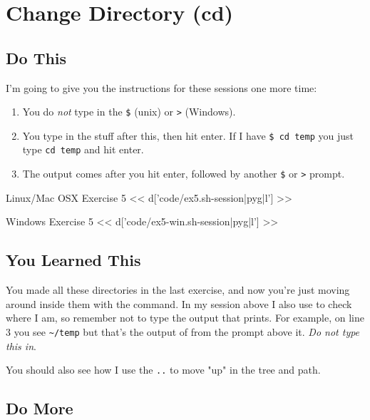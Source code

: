 \chapter{Change Directory (cd)}

\section{Do This}

I'm going to give you the instructions for these sessions one more time:

\begin{enumerate} 
\item You do \emph{not} type in the \verb|$| (unix) or \verb|>| (Windows).
\item You type in the stuff after this, then hit enter.  If I have \verb|$ cd temp| you just type \verb|cd temp| and hit enter.
\item The output comes after you hit enter, followed by another \verb|$| or \verb|>| prompt.
\end{enumerate}

\begin{code}{Linux/Mac OSX Exercise 5}
<< d['code/ex5.sh-session|pyg|l'] >>
\end{code}

\begin{code}{Windows Exercise 5}
<< d['code/ex5-win.sh-session|pyg|l'] >>
\end{code}

\section{You Learned This}

You made all these directories in the last exercise, and now you're just moving around inside them with the
 command.  In my session above I also use  to check
where I am, so remember not to type the output that  prints.
For example, on line 3 you see \verb|~/temp| but that's the output of 
from the prompt above it.  \emph{Do not type this in}.

You should also see how I use the \verb|..| to move "up" in the tree and path.



\section{Do More}

